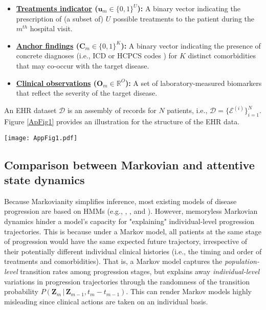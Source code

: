 \documentclass[twoside,11pt]{article}
\begin{document}
\begin{itemize}
\item {\bf \underline{Treatments indicator} (\mbox{\footnotesize $\boldsymbol{u}_{m} \in \{0,1\}^U$}):} A binary vector indicating the prescription of (a subset of) \mbox{\footnotesize $U$} possible treatments to the patient during the \mbox{\footnotesize $m^{th}$} hospital visit. 
\item {\bf \underline{Anchor findin}g\underline{s} (\mbox{\footnotesize $\boldsymbol{C}_{m} \in \{0,1\}^K$}):} A binary vector indicating the presence of concrete diagnoses (i.e., ICD or HCPCS codes \cite{blumenthal2010meaningful}) for \mbox{\footnotesize $K$} distinct comorbidities that may co-occur with the target disease. 
\item {\bf \underline{Clinical observations} (\mbox{\footnotesize $\boldsymbol{O}_{m} \in \mathbb{R}^O$}):} A set of laboratory-measured biomarkers that reflect the severity of the target disease.
\end{itemize}
An EHR dataset \mbox{\footnotesize $\mathcal{D}$} is an assembly of records for \mbox{\footnotesize $N$} patients, i.e., \mbox{\footnotesize $\mathcal{D} = \{\mathcal{E}^{(i)}\}_{i=1}^N$}. Figure \ref{ApFig1} provides an illustration for the structure of the EHR data.
\begin{figure*}[h]
  \centering
  \texttt{[image: AppFig1.pdf]}
  \caption{\footnotesize Illustration for the structure of the EHR data.} 
	\label{ApFig1}
\end{figure*}

\newpage
\subsection*{Comparison between Markovian and attentive state dynamics}
Because Markovianity simplifies inference, most existing models of disease progression are based on HMMs (e.g., \cite{alaa2017learning}, \cite{liu2015efficient}, and \cite{wang2014unsupervised}). However, memoryless Markovian dynamics hinder a model's capacity for "explaining" individual-level progression trajectories. This is because under a Markov model, all patients at the same stage of progression would have the same expected future trajectory, irrespective of their potentially different individual clinical histories (i.e., the timing and order of treatments and comorbidities). That is, a Markov model captures the {\it population-level} transition rates among progression stages, but explains away {\it individual-level} variations in progression trajectories through the randomness of the transition probability \mbox{\footnotesize $P(\boldsymbol{Z}_m\,|\,\boldsymbol{Z}_{m-1},t_m-t_{m-1})$}. This can render Markov models highly misleading since clinical actions are taken on an individual basis. 
\end{document}
